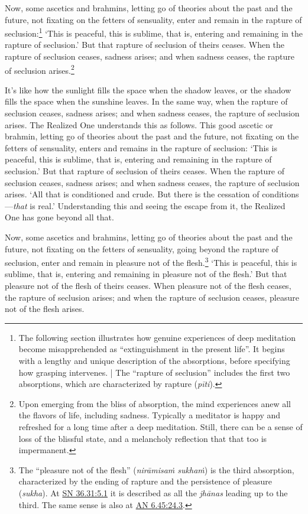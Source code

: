 \documentclass[12pt,openany]{book}%
\begin{document}
Now, some ascetics and brahmins, letting go of theories about the past and the future, not fixating on the fetters of sensuality, enter and remain in the rapture of seclusion:\footnote{The following section illustrates how genuine experiences of deep meditation become misapprehended as “extinguishment in the present life”. It begins with a lengthy and unique description of the absorptions, before specifying how grasping intervenes. | The “rapture of seclusion” includes the first two absorptions, which are characterized by rapture (\textit{\textsanskrit{pīti}}). } ‘This is peaceful, this is sublime, that is, entering and remaining in the rapture of seclusion.’ But that rapture of seclusion of theirs ceases. When the rapture of seclusion ceases, sadness arises; and when sadness ceases, the rapture of seclusion arises.\footnote{Upon emerging from the bliss of absorption, the mind experiences anew all the flavors of life, including sadness. Typically a meditator is happy and refreshed for a long time after a deep meditation. Still, there can be a sense of loss of the blissful state, and a melancholy reflection that that too is impermanent. } 

It’s like how the sunlight fills the space when the shadow leaves, or the shadow fills the space when the sunshine leaves. In the same way, when the rapture of seclusion ceases, sadness arises; and when sadness ceases, the rapture of seclusion arises. The Realized One understands this as follows. This good ascetic or brahmin, letting go of theories about the past and the future, not fixating on the fetters of sensuality, enters and remains in the rapture of seclusion: ‘This is peaceful, this is sublime, that is, entering and remaining in the rapture of seclusion.’ But that rapture of seclusion of theirs ceases. When the rapture of seclusion ceases, sadness arises; and when sadness ceases, the rapture of seclusion arises. ‘All that is conditioned and crude. But there is the cessation of conditions—\emph{that} is real.’ Understanding this and seeing the escape from it, the Realized One has gone beyond all that. 

Now, some ascetics and brahmins, letting go of theories about the past and the future, not fixating on the fetters of sensuality, going beyond the rapture of seclusion, enter and remain in pleasure not of the flesh.\footnote{The “pleasure not of the flesh” (\textit{\textsanskrit{nirāmisaṁ} \textsanskrit{sukhaṁ}}) is the third absorption, characterized by the ending of rapture and the persistence of pleasure (\textit{sukha}). At \href{https://suttacentral.net/sn36.31/en/sujato\#5.1}{SN 36.31:5.1} it is described as all the \textit{\textsanskrit{jhānas}} leading up to the third. The same sense is also at \href{https://suttacentral.net/an6.45/en/sujato\#24.3}{AN 6.45:24.3}. } ‘This is peaceful, this is sublime, that is, entering and remaining in pleasure not of the flesh.’ But that pleasure not of the flesh of theirs ceases. When pleasure not of the flesh ceases, the rapture of seclusion arises; and when the rapture of seclusion ceases, pleasure not of the flesh arises. 
\end{document}
